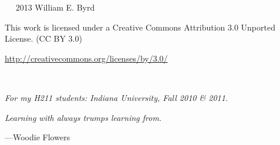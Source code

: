 \documentclass{tufte-book} %
\newcommand{\blankpage}{\newpage\hbox{}\thispagestyle{empty}\newpage} %
\begin{document}
\begin{schemeregion}

\frontmatter



\blankpage




\newpage

\begin{fullwidth}
~\vfill
\thispagestyle{empty}
\setlength{\parindent}{0pt}
\setlength{\parskip}{\baselineskip}
\large
\noindent
\textcopyright~2013 William E. Byrd

\huge
\noindent
\ccLogo
\ccAttribution

\large
\noindent
This work is licensed under a Creative Commons Attribution 3.0 Unported License.
(CC BY 3.0)

\noindent
\url{http://creativecommons.org/licenses/by/3.0/}
\normalsize
\end{fullwidth}



\cleardoublepage
\begin{fullwidth}
~\vfill
\begin{doublespace}
\noindent\fontsize{18}{22}\selectfont\itshape
\nohyphenation
For my H211 students: Indiana University, Fall 2010 \& 2011.
\end{doublespace}
\begin{flushright}
\textit{Learning with always trumps learning from.}

\wspace

---Woodie Flowers
\end{flushright}
\vfill
\vfill
\end{fullwidth}


\blankpage

\tableofcontents

%

\mainmatter





\end{schemeregion}
\end{document}
